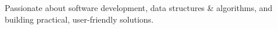 \documentclass[10pt,a4paper,withhyper]{altacv}
\begin{document}
\begin{paracol}{2}











\switchcolumn


Passionate about software development, data structures \& algorithms, and building practical, user-friendly solutions.





\end{paracol}
\end{document}
